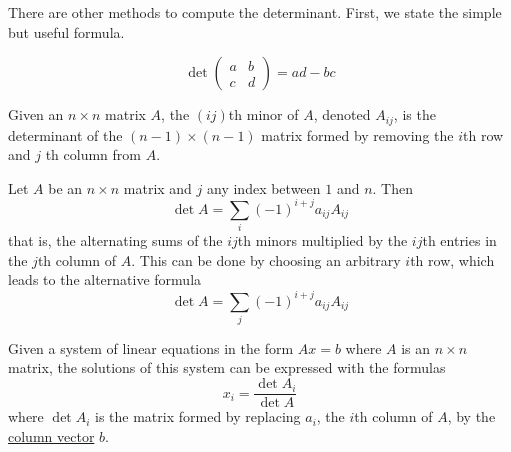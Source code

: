   There are other methods to compute the determinant. First, we state the simple but useful formula.

  \begin{theorem}
    \label{thm:determinant-of-a-2times2-matrix}
    \begin{equation}
      \det{\begin{pmatrix}
      a&b\\c&d 
      \end{pmatrix}} = a d - b c
    \end{equation}
  \end{theorem}

  \begin{definition}
    \label{def:minor-of-a-matrix}
    Given an $n \times n$ matrix $A$, the $(i j)$th minor of $A$, denoted $A_{i j}$, is the determinant of the $(n-1) \times (n-1)$ matrix formed by removing the $i$th row and $j$ th column from $A$. 
  \end{definition}

  \begin{theorem}
    \label{thm:laplace-expansion}
    Let $A$ be an $n \times n$ matrix and $j$ any index between $1$ and $n$. Then
    \begin{equation}
      \det{A} = \sum_i (-1)^{i + j} a_{i j} A_{i j}
    \end{equation}
    that is, the alternating sums of the $ij$th minors multiplied by the $ij$th entries in the $j$th column of $A$. This can be done by choosing an arbitrary $i$th row, which leads to the alternative formula 
    \begin{equation}
      \det{A} = \sum_j (-1)^{i + j} a_{i j} A_{i j} 
    \end{equation}
  \end{theorem}

  \begin{theorem}
    \label{thm:cramers-rule}
    Given a system of linear equations in the form $A x = b$ where $A$ is an $n \times n$ matrix, the solutions of this system can be expressed with the formulas 
    \begin{equation}
      x_i = \frac{ \det{A_i}}{\det{A}}
    \end{equation}
    where $\det{A_i}$ is the matrix formed by replacing $a_i$, the $i$th column of $A$, by the \hyperref[def:column-vector]{column vector} $b$. 
  \end{theorem}

